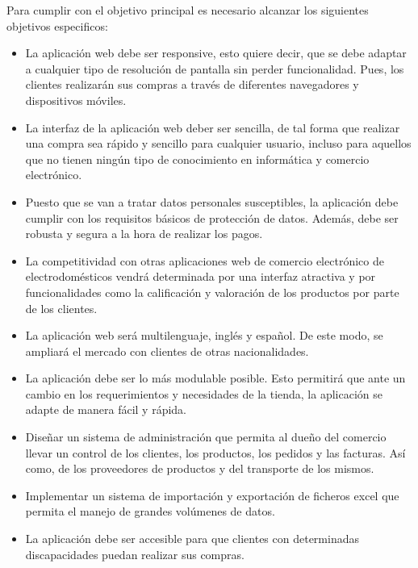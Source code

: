 \documentclass[a4paper, 12pt]{book}
\begin{document}
Para cumplir con el objetivo principal es necesario alcanzar los siguientes objetivos especificos: 
\begin{itemize}
\item La aplicación web debe ser responsive, esto quiere decir, que se debe adaptar a cualquier tipo de resolución de pantalla sin perder funcionalidad. Pues, los clientes realizarán sus compras a través de diferentes navegadores y dispositivos móviles.

\item La interfaz de la aplicación web deber ser sencilla, de tal forma que realizar una compra sea rápido y sencillo para cualquier usuario, incluso para aquellos que no tienen ningún tipo de conocimiento en informática y comercio electrónico.

\item Puesto que  se van a tratar datos personales susceptibles, la aplicación debe cumplir con los requisitos básicos de protección de datos. Además, debe ser robusta y segura a la hora de realizar los pagos. 

\item La competitividad con otras aplicaciones web de comercio electrónico de electrodomésticos vendrá determinada por una interfaz atractiva y por funcionalidades como la calificación y valoración de los productos por parte de los clientes.

\item La aplicación web será multilenguaje, inglés y español. De este modo, se ampliará el mercado con clientes de  otras nacionalidades. 

\item La aplicación debe ser lo más modulable posible. Esto permitirá que ante un cambio en los requerimientos y necesidades de la tienda, la aplicación se adapte de manera fácil y rápida. 

\item Diseñar un sistema de administración que permita al dueño del comercio llevar un control de los clientes, los productos, los pedidos y las facturas. Así como, de los proveedores de productos y del transporte de los mismos. 

\item Implementar un sistema de importación y exportación de ficheros excel que permita el manejo de grandes volúmenes de datos. 

\item La aplicación debe ser accesible para que clientes con determinadas discapacidades puedan realizar sus compras. 

\end{itemize}
\end{document}
